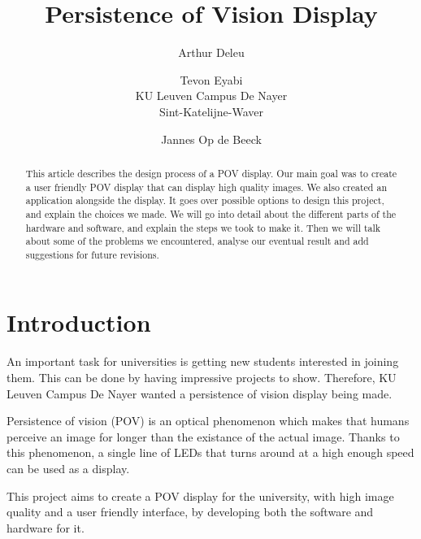 \documentclass[10pt,twocolumn,letterpaper]{article}
\begin{document}
\title{Persistence of Vision Display}

\author{Arthur Deleu\\
\and
Tevon Eyabi\\
KU Leuven Campus De Nayer\\
Sint-Katelijne-Waver\\
\and
Jannes Op de Beeck\\
}

\maketitle
\ificcvfinal\thispagestyle{empty}\fi

\begin{abstract}

This article describes the design process of a POV display.
Our main goal was to create a user friendly POV display that can display high quality images. We also created an application alongside the display.
It goes over possible options to design this project, and explain the choices we made. 
We will go into detail about the different parts of the hardware and software, and explain the steps we took to make it.
Then we will talk about some of the problems we encountered, analyse our eventual result and add suggestions for future revisions.

\end{abstract}

\section{Introduction}

An important task for universities is getting new students interested in joining them. This can be done by having impressive projects to show.
Therefore, KU Leuven Campus De Nayer wanted a persistence of vision display being made. 

Persistence of vision (POV) is an optical phenomenon which makes that humans perceive an image for longer than the existance of the actual image.
Thanks to this phenomenon, a single line of LEDs that turns around at a high enough speed can be used as a display.

This project aims to create a POV display for the university, with high image quality and a user friendly interface, by developing both the software and hardware for it.

\end{document}
